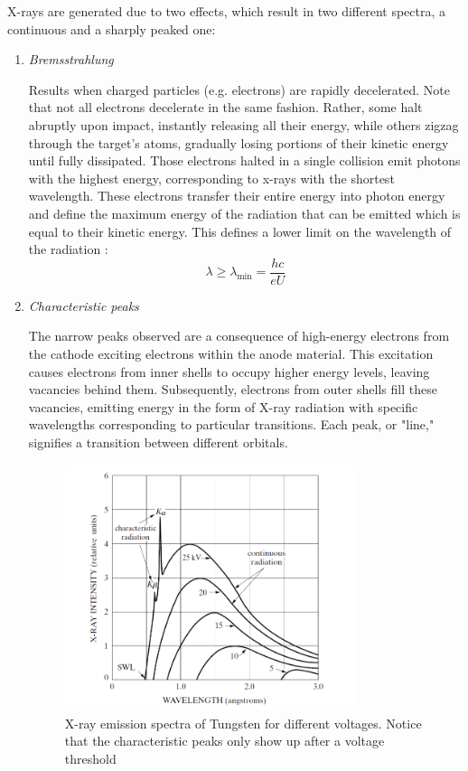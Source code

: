 \documentclass{article}
\begin{document}
X-rays are generated due to two effects, which result in two different spectra, a continuous and a sharply peaked one:

\begin{enumerate}

\item \textit{Bremsstrahlung}

Results when charged particles (e.g. electrons) are rapidly decelerated. Note that not all electrons decelerate in the same fashion. Rather, some halt abruptly upon impact, instantly releasing all their energy, while others zigzag through the target's atoms, gradually losing portions of their kinetic energy until fully dissipated. Those electrons halted in a single collision emit photons with the highest energy, corresponding to x-rays with the shortest wavelength. These electrons transfer their entire energy into photon energy and define the maximum energy of the radiation that can be emitted which is equal to their kinetic energy. This defines a lower limit on the wavelength of the radiation \cite{bernarddeniscullity_2015_elements}: 
\begin{equation}
    \lambda \geq \lambda_{\min} = \frac{hc}{eU}
\end{equation}

\item \textit{Characteristic peaks}

The narrow peaks observed are a consequence of high-energy electrons from the cathode exciting electrons within the anode material. This excitation causes electrons from inner shells to occupy higher energy levels, leaving vacancies behind them. Subsequently, electrons from outer shells fill these vacancies, emitting energy in the form of X-ray radiation with specific wavelengths corresponding to particular transitions. Each peak, or "line," signifies a transition between different orbitals.
\begin{figure}[h]
    \centering
    \includegraphics[width=0.8\textwidth]{Figures/fig1.png}
    \caption{X-ray emission spectra of Tungsten for different voltages. Notice that the characteristic peaks only show up after a voltage threshold}
    \label{fig:xrayemission}
\end{figure}
\end{enumerate}
\end{document}
